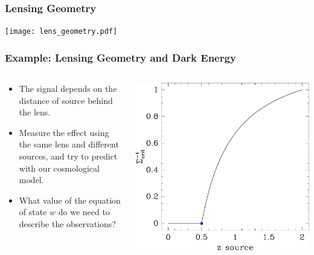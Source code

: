 \documentclass{beamer}
\begin{document}
\frame
{
    \frametitle{Lensing Geometry}

    \texttt{[image: lens\_geometry.pdf]}

}

\frame
{
    \frametitle{Example: Lensing Geometry and Dark Energy}

    \begin{columns}
        \begin{column}{0.5\textwidth}    
            \begin{itemize}

                \item The signal depends on the distance of source behind
                    the lens.

                \item Measure the effect using the same lens and different
                    sources, and try to predict with our cosmological model.

                \item What value of the equation of state $w$ do we need to
                    describe the observations?

            \end{itemize}
        \end{column}
        \begin{column}{0.5\textwidth}
            \includegraphics[width=\textwidth]{scinv-example.pdf}
        \end{column}
    \end{columns}
}
\end{document}

